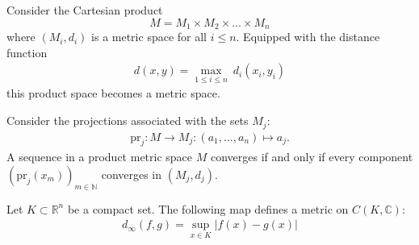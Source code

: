 	\begin{example}
		Consider the Cartesian product \[M = M_1\times M_2\times ... \times M_n\] where $(M_i,d_i)$ is a metric space for all $i\leq n$. Equipped with the distance function
		\begin{gather}
			d(x,y) = \underset{1\leq i\leq n}{\max}\ d_i(x_i,y_i)
		\end{gather}
		this product space becomes a metric space.
	\end{example}
	\begin{property}
		Consider the projections associated with the sets $M_j$:
		\begin{gather}
			\label{metric:projection}
			\text{pr}_j:M\rightarrow M_j:(a_1,...,a_n)\mapsto a_j.
		\end{gather}
		A sequence in a product metric space $M$ converges if and only if every component $(\text{pr}_j(x_m))_{m\in\mathbb{N}}$ converges in $(M_j, d_j)$.
	\end{property}

	\begin{example}
		Let $K\subset\mathbb{R}^n$ be a compact set. The following map defines a metric on $C(K,\mathbb{C})$:
		\begin{gather}
			\label{topology:supremum_distance}
			d_\infty(f,g) = \sup_{x\in K}|f(x) - g(x)|
		\end{gather}
	\end{example}

